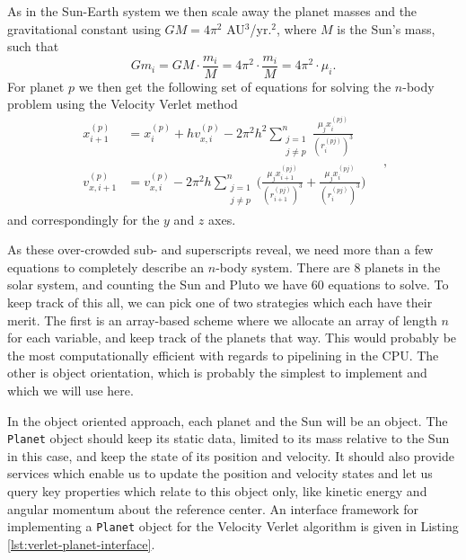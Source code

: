 \documentclass[]{article}
\begin{document}
As in the Sun-Earth system we then scale away the planet masses and the gravitational constant using $GM = 4 \pi^2$ AU$^3$/yr.$^2$, where $M$ is the Sun's mass, such that
\begin{equation}
	Gm_i = GM \cdot \frac{m_i}{M} = 4\pi^2 \cdot \frac{m_i}{M} = 4\pi^2 \cdot \mu_i.
\end{equation}
For planet $p$ we then get the following set of equations for solving the $n$-body problem using the Velocity Verlet method 
\begin{equation} \label{verlet-n}
\begin{aligned}
	x_{i+1}^{(p)} &= x_i^{(p)} + hv_{x,i}^{(p)} - 2\pi^2h^2 \sum_{\substack{j=1  \\ j \neq p}}^{n} \frac{\mu_j x_i^{(pj)}}{(r_i^{(pj)})^3} \\
	v_{x,i+1}^{(p)} &= v_{x,i}^{(p)} - 2\pi^2h \sum_{\substack{j=1  \\ j \neq p}}^{n} \bigg(\frac{\mu_j x_{i+1}^{(pj)}}{(r_{i+1}^{(pj)})^3} + \frac{\mu_j x_i^{(pj)}}{(r_i^{(pj)})^3} \bigg)	
\end{aligned} \quad ,
\end{equation}
and correspondingly for the $y$ and $z$ axes.

As these over-crowded sub- and superscripts reveal, we need more than a few equations to completely describe an $n$-body system. There are 8 planets in the solar system, and counting the Sun and Pluto we have 60 equations to solve. To keep track of this all, we can pick one of two strategies which each have their merit. The first is an array-based scheme where we allocate an array of length $n$ for each variable, and keep track of the planets that way. This would probably be the most computationally efficient with regards to pipelining in the CPU. The other is object orientation, which is probably the simplest to implement and which we will use here.

In the object oriented approach, each planet and the Sun will be an object. The \lstinline|Planet| object should keep its static data, limited to its mass relative to the Sun in this case, and keep the state of its position and velocity. It should also provide services which enable us to update the position and velocity states and let us query key properties which relate to this object only, like kinetic energy and angular momentum about the reference center. An interface framework for implementing a \lstinline|Planet| object for the Velocity Verlet algorithm is given in Listing \ref{lst:verlet-planet-interface}.
\end{document}
